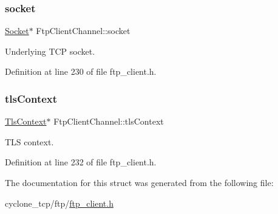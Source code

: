 \subsubsection{\texorpdfstring{socket}{socket}}
{\footnotesize\ttfamily \hyperlink{socket_8h_aa85acfb0fa336ef495e6ba87fb88fc48}{Socket}$\ast$ Ftp\+Client\+Channel\+::socket}



Underlying T\+CP socket. 



Definition at line 230 of file ftp\+\_\+client.\+h.

\mbox{\label{structFtpClientChannel_aac12ca144cff862f259dbb77ee84d9be}} 
\subsubsection{\texorpdfstring{tls\+Context}{tlsContext}}
{\footnotesize\ttfamily \hyperlink{tls_8h_ac09f7a286c0cdf9b07ee1edd107946f5}{Tls\+Context}$\ast$ Ftp\+Client\+Channel\+::tls\+Context}



T\+LS context. 



Definition at line 232 of file ftp\+\_\+client.\+h.



The documentation for this struct was generated from the following file\+:\begin{DoxyCompactItemize}
\item 
cyclone\+\_\+tcp/ftp/\hyperlink{ftp__client_8h}{ftp\+\_\+client.\+h}\end{DoxyCompactItemize}
